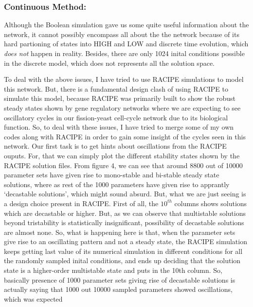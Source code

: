 \documentclass{article}
\begin{document}
\subsubsection*{Continuous Method:} 
Although the Boolean simulation gave us some quite useful information about
the network, it cannot possibly encompass all about the the network because 
of its hard partioning of states into HIGH and LOW and discrete time evolution,
which \textit{does not} happen in reality. Besides, there are only 1024 inital 
conditions possible in the discrete model, which does not represents all the 
solution space.

To deal with the above issues, I have tried to use RACIPE simulations to model 
this network. But, there is a fundamental design clash of using RACIPE to 
simulate this model, because RACIPE was primarily built to show the robust 
steady states shown by gene regulatory networks where we are expecting to 
see oscillatory cycles in our fission-yeast cell-cycle network due to its 
biological function. So, to deal with these issues, I have tried to merge some 
of my own codes along with RACIPE in order to gain some insight of the cycles 
seen in this network. 
\newline \newline 
Our first task is to get hints about oscillations from the RACIPE ouputs. For,
that we can simply plot the different stability states shown by the RACIPE 
solution files. From figure 4, we can see that around 8800 out of 10000 parameter
sets have given rise to mono-stable and bi-stable steady state solutions, where 
as rest of the 1000 parameters have given rise to apprantly `decastable solutions', 
which might sound absurd. But, what we are just seeing is a design choice present 
in RACIPE. First of all, the $10^{th}$ columns shows solutions which are decastable 
or higher. But, as we can observe that multistable solutions beyond tristability is 
statistically insignificant, possibility of decastable solutions are 
almost none. So, what is happening here is that, when the parameter sets give rise 
to an oscillating pattern and not a steady state, the RACIPE simulation keeps getting 
last value of its numerical simulation in different conditions for all the 
randomly sampled inital conditions, and ends up deciding that the solution state 
is a higher-order multistable state and puts in the 10th column. So, basically 
presence of 1000 parameter sets giving rise of decastable solutions is actually saying 
that 1000 out 10000 sampled parameters showed oscillations, which was expected 
\end{document}
